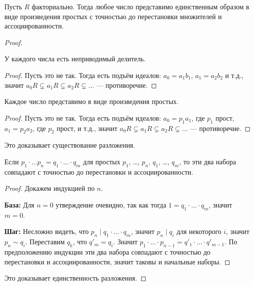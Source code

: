 \documentclass[12pt,a4paper]{article}
\begin{document}
    \begin{theorem}
        Пусть $R$ факториально. Тогда любое число представимо единственным образом в виде произведения простых с точностью до перестановки множителей и ассоциированности.
    \end{theorem}

    \begin{proof}
        \begin{thlemma}
            У каждого числа есть неприводимый делитель.
        \end{thlemma}

        \begin{proof}
            Пусть это не так. Тогда есть подъём идеалов: $a_0 = a_1 b_1$, $a_1 = a_2 b_2$ и т.д., значит $a_0 R \subsetneq a_1 R \subsetneq a_2 R \subsetneq \dots$ --- противоречие.
        \end{proof}

        \begin{thlemma}
            Каждое число представимо в виде произведения простых.
        \end{thlemma}

        \begin{proof}
            Пусть это не так. Тогда есть подъём идеалов: $a_0 = p_1 a_1$, где $p_1$ прост, $a_1 = p_2 a_2$, где $p_2$ прост, и т.д., значит $a_0 R \subsetneq a_1 R \subsetneq a_2 R \subsetneq \dots$ --- противоречие.
        \end{proof}

        Это доказывает существование разложения.

        \begin{thlemma}
            Если $p_1 \cdot \dots p_n = q_1 \cdot \dots \cdot q_m$ для простых $p_1$, \dots, $p_n$, $q_1$, \dots, $q_m$, то эти два набора совпадают с точностью до перестановки и ассоциированности.
        \end{thlemma}

        \begin{proof}
            Докажем индукцией по $n$.

            \textbf{База:} Для $n=0$ утверждение очевидно, так как тогда $1 = q_1 \cdot \dots \cdot q_m$, значит $m=0$.

            \textbf{Шаг:} Несложно видеть, что $p_n \mid q_1 \cdot \dots \cdot q_m$, значит $p_n \mid q_i$ для некоторого $i$, значит $p_n \sim q_i$. Переставим $q_k$, что $q'_m = q_i$. Значит $p_1 \cdot \dots \cdot p_{n-1} = q'_1 \cdot \dots \cdot q'_{m-1}$. По предположению индукции эти два набора совпадают с точностью до перестановки и ассоциированности, значит таковы и начальные наборы.
        \end{proof}

        Это доказывает единственность разложения.
    \end{proof}
\end{document}
